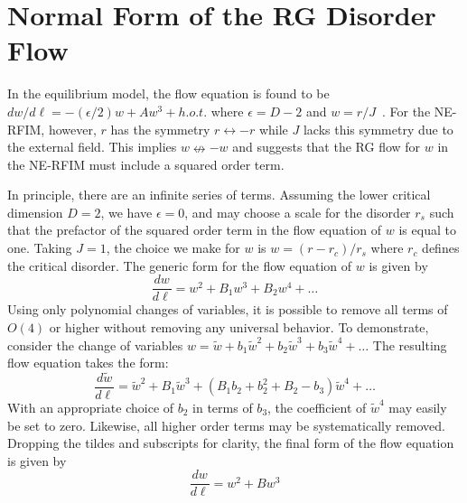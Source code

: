 \documentclass[reprint,amsmath,amssymb,aps,floatfix]{revtex4-1}
\begin{document}
\section{\label{app:normalform} Normal Form of the RG Disorder Flow}
In the equilibrium model, the flow equation is found to be $dw/d\ell=-(\epsilon/2)w+Aw^3+h.o.t.$ where $\epsilon=D-2$ and $w=r/J$~\cite{BrayMoore85}. For the NE-RFIM, however, $r$ has the symmetry $r \leftrightarrow -r$ while $J$ lacks this symmetry due to the external field. This implies $w \nleftrightarrow -w$ and suggests that the RG flow for $w$ in the NE-RFIM must include a squared order term.\par
%
In principle, there are an infinite series of terms.  Assuming the lower critical dimension $D=2$, we have $\epsilon=0$, and may choose a scale for the disorder $r_s$ such that the prefactor of the squared order term in the flow equation of $w$ is equal to one. Taking $J=1$, the choice we make for $w$ is $w=(r-r_c)/r_s$ where $r_c$ defines the critical disorder. The generic form for the flow equation of $w$ is given by
%
\begin{equation}
	\frac{dw}{d\ell}=w^2+B_1 w^3+ B_2 w^4 + \dots 
\end{equation}
%
\noindent Using only polynomial changes of variables, it is possible to remove all terms of $O(4)$ or higher without removing any universal behavior. To demonstrate, consider the change of variables $w = \tilde{w} + b_1\tilde{w}^2+b_2\tilde{w}^3+b_3\tilde{w}^4+\dots$ The resulting flow equation takes the form:
%
\begin{equation}
	\frac{d\tilde{w}}{d\ell}=\tilde{w}^2+B_1 \tilde{w}^3+ (B_1b_2+b_2^2+B_2-b_3) \tilde{w}^4 + \dots
\end{equation} 
%
\noindent With an appropriate choice of $b_2$ in terms of $b_3$, the coefficient of $\tilde{w}^4$ may easily be set to zero. Likewise, all higher order terms may be systematically removed. Dropping the tildes and subscripts for clarity, the final form of the flow equation is given by 
%
\begin{equation}
	\label{eq:TruncNF}
	\frac{dw}{d\ell}=w^2+B w^3
\end{equation}
\end{document}
